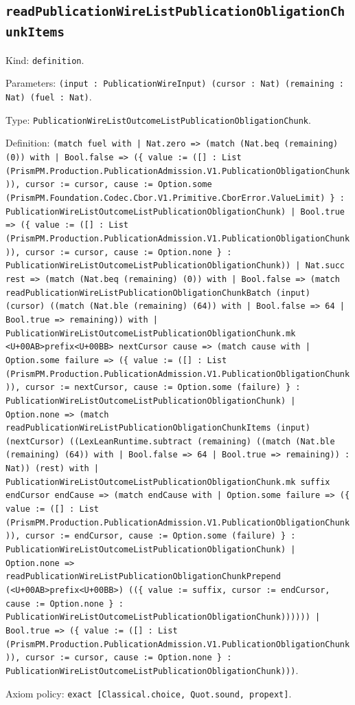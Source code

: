 \documentclass[11pt]{article}
\begin{document}
\subsection*{\texttt{readPublicationWireListPublicationObligationChunkItems}}
\noindent Kind: \texttt{definition}.\par
\noindent Parameters: \texttt{(input : PublicationWireInput) (cursor : Nat) (remaining : Nat) (fuel : Nat)}.\par
\noindent Type: \texttt{PublicationWireListOutcomeListPublicationObligationChunk}.\par
\noindent Definition: \texttt{(match fuel with | Nat.zero => (match (Nat.beq (remaining) (0)) with | Bool.false => (\{ value := ([] : List (PrismPM.Production.PublicationAdmission.V1.PublicationObligationChunk)), cursor := cursor, cause := Option.some (PrismPM.Foundation.Codec.Cbor.V1.Primitive.CborError.ValueLimit) \} : PublicationWireListOutcomeListPublicationObligationChunk) | Bool.true => (\{ value := ([] : List (PrismPM.Production.PublicationAdmission.V1.PublicationObligationChunk)), cursor := cursor, cause := Option.none \} : PublicationWireListOutcomeListPublicationObligationChunk)) | Nat.succ rest => (match (Nat.beq (remaining) (0)) with | Bool.false => (match readPublicationWireListPublicationObligationChunkBatch (input) (cursor) ((match (Nat.ble (remaining) (64)) with | Bool.false => 64 | Bool.true => remaining)) with | PublicationWireListOutcomeListPublicationObligationChunk.mk <U+00AB>prefix<U+00BB> nextCursor cause => (match cause with | Option.some failure => (\{ value := ([] : List (PrismPM.Production.PublicationAdmission.V1.PublicationObligationChunk)), cursor := nextCursor, cause := Option.some (failure) \} : PublicationWireListOutcomeListPublicationObligationChunk) | Option.none => (match readPublicationWireListPublicationObligationChunkItems (input) (nextCursor) ((LexLeanRuntime.subtract (remaining) ((match (Nat.ble (remaining) (64)) with | Bool.false => 64 | Bool.true => remaining)) : Nat)) (rest) with | PublicationWireListOutcomeListPublicationObligationChunk.mk suffix endCursor endCause => (match endCause with | Option.some failure => (\{ value := ([] : List (PrismPM.Production.PublicationAdmission.V1.PublicationObligationChunk)), cursor := endCursor, cause := Option.some (failure) \} : PublicationWireListOutcomeListPublicationObligationChunk) | Option.none => readPublicationWireListPublicationObligationChunkPrepend (<U+00AB>prefix<U+00BB>) ((\{ value := suffix, cursor := endCursor, cause := Option.none \} : PublicationWireListOutcomeListPublicationObligationChunk)))))) | Bool.true => (\{ value := ([] : List (PrismPM.Production.PublicationAdmission.V1.PublicationObligationChunk)), cursor := cursor, cause := Option.none \} : PublicationWireListOutcomeListPublicationObligationChunk)))}.\par
\noindent Axiom policy: \texttt{exact [Classical.choice, Quot.sound, propext]}.\par
\end{document}
